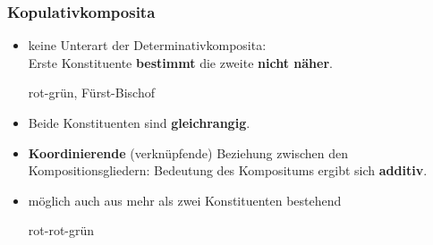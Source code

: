 \begin{frame}
\frametitle{Kopulativkomposita}

\begin{itemize}
	\item keine Unterart der Determinativkomposita: \\
	Erste Konstituente \textbf{bestimmt} die zweite \textbf{nicht näher}.
	
	\ea rot-grün, Fürst-Bischof
	\z 
	
	\item Beide Konstituenten sind \textbf{gleichrangig}.
	
	\item \textbf{Koordinierende} (\dash verknüpfende) Beziehung zwischen den Kompositionsgliedern: Bedeutung des Kompositums ergibt sich \textbf{additiv}.
	
	\settowidth{} 
	\ea 
		 
		 
		\z 
	\z 

	\item möglich auch aus mehr als zwei Konstituenten bestehend

	\settowidth{} 		
	\ea rot-rot-grün 
	\z 
	
\end{itemize}

\end{frame}


